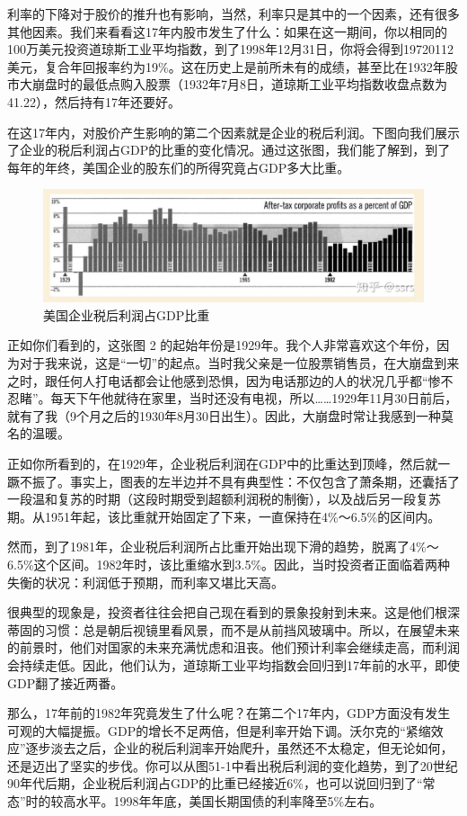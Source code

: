 \documentclass[UTF8,a4paper,zihao=-4,fontset = windows]{ctexart} %
\begin{document}
利率的下降对于股价的推升也有影响，当然，利率只是其中的一个因素，还有很多其他因素。我们来看看这17年内股市发生了什么：如果在这一期间，你以相同的100万美元投资道琼斯工业平均指数，到了1998年12月31日，你将会得到19720112美元，复合年回报率约为19\%。这在历史上是前所未有的成绩，甚至比在1932年股市大崩盘时的最低点购入股票（1932年7月8日，道琼斯工业平均指数收盘点数为41.22），然后持有17年还要好。

在这17年内，对股价产生影响的第二个因素就是企业的税后利润。下图向我们展示了企业的税后利润占GDP的比重的变化情况。通过这张图，我们能了解到，到了每年的年终，美国企业的股东们的所得究竟占GDP多大比重。
\begin{figure}[h!]
    \includegraphics[scale=0.28]{gdp.jpg} 
    \caption{美国企业税后利润占GDP比重}
    \label{gdp}
\end{figure}

正如你们看到的，这张图 2 的起始年份是1929年。我个人非常喜欢这个年份，因为对于我来说，这是“一切”的起点。当时我父亲是一位股票销售员，在大崩盘到来之时，跟任何人打电话都会让他感到恐惧，因为电话那边的人的状况几乎都“惨不忍睹”。每天下午他就待在家里，当时还没有电视，所以……1929年11月30日前后，就有了我（9个月之后的1930年8月30日出生）。因此，大崩盘时常让我感到一种莫名的温暖。

正如你所看到的，在1929年，企业税后利润在GDP中的比重达到顶峰，然后就一蹶不振了。事实上，图表的左半边并不具有典型性：不仅包含了萧条期，还囊括了一段温和复苏的时期（这段时期受到超额利润税的制衡），以及战后另一段复苏期。从1951年起，该比重就开始固定了下来，一直保持在4\%～6.5\%的区间内。

然而，到了1981年，企业税后利润所占比重开始出现下滑的趋势，脱离了4\%～6.5\%这个区间。1982年时，该比重缩水到3.5\%。因此，当时投资者正面临着两种失衡的状况：利润低于预期，而利率又堪比天高。

很典型的现象是，投资者往往会把自己现在看到的景象投射到未来。这是他们根深蒂固的习惯：总是朝后视镜里看风景，而不是从前挡风玻璃中。所以，在展望未来的前景时，他们对国家的未来充满忧虑和沮丧。他们预计利率会继续走高，而利润会持续走低。因此，他们认为，道琼斯工业平均指数会回归到17年前的水平，即使GDP翻了接近两番。

那么，17年前的1982年究竟发生了什么呢？在第二个17年内，GDP方面没有发生可观的大幅提振。GDP的增长不足两倍，但是利率开始下调。沃尔克的“紧缩效应”逐步淡去之后，企业的税后利润率开始爬升，虽然还不太稳定，但无论如何，还是迈出了坚实的步伐。你可以从图51-1中看出税后利润的变化趋势，到了20世纪90年代后期，企业税后利润占GDP的比重已经接近6\%，也可以说回归到了“常态”时的较高水平。1998年年底，美国长期国债的利率降至5\%左右。
\end{document}
